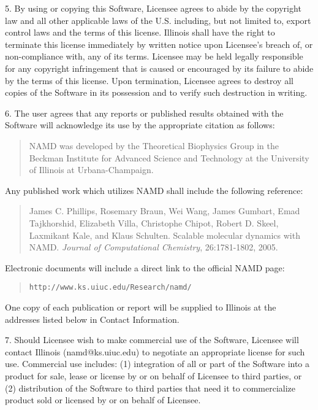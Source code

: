 5. By using or copying this Software, Licensee agrees to abide by the
copyright law and all other applicable laws of the U.S. including, but 
not limited to, export control laws and the terms of this license. 
Illinois shall have the right to terminate this license immediately by 
written notice upon Licensee's breach of, or non-compliance with, any 
of its terms. Licensee may be held legally responsible for any copyright 
infringement that is caused or encouraged by its failure to abide by 
the terms of this license. Upon termination, Licensee agrees to destroy 
all copies of the Software in its possession and to verify such 
destruction in writing.

6. The user agrees that any reports or published results obtained 
with the Software will acknowledge its use by the appropriate citation 
as follows: 

\begin{quote}
 NAMD was developed by the Theoretical Biophysics Group in the 
 Beckman Institute for Advanced Science and Technology at the 
 University of Illinois at Urbana-Champaign.
\end{quote}

Any published work which utilizes NAMD shall include the following reference: 

\begin{quote}
 James C. Phillips, Rosemary Braun, Wei Wang, James Gumbart,
 Emad Tajkhorshid, Elizabeth Villa, Christophe Chipot, Robert D. Skeel,
 Laxmikant Kale, and Klaus Schulten. Scalable molecular dynamics with NAMD.
 {\it Journal of Computational Chemistry}, 26:1781-1802, 2005.
\end{quote}

Electronic documents will include a direct link to the official NAMD page:

\begin{quote}
{\tt http://www.ks.uiuc.edu/Research/namd/}
\end{quote}

One copy of each publication or report will be supplied to Illinois 
at the addresses listed below in Contact Information.

7. Should Licensee wish to make commercial use of the Software, Licensee 
will contact Illinois (namd@ks.uiuc.edu) to negotiate an appropriate 
license for such use. Commercial use includes: (1) integration of all 
or part of the Software into a product for sale, lease or license by or 
on behalf of Licensee to third parties, or (2) distribution of the 
Software to third parties that need it to commercialize product sold or 
licensed by or on behalf of Licensee.


